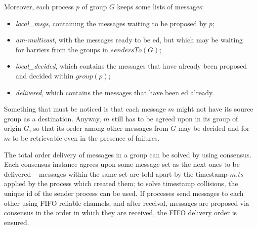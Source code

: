 \documentclass[times, 10pt]{article}
\begin{document}
Moreover, each process $p$ of group $G$ keeps some lists of messages:
\begin{itemize}
  \item \textit{local\_msgs}, containing the messages waiting to be proposed by $p$;
  \item \textit{am-multicast}, with the messages ready to be \cons{}ed, but which may be waiting for barriers from the groups in $sendersTo(G)$;
  \item \textit{local\_decided}, which contains the messages that have already been proposed and decided within $group(p)$;
  \item \textit{delivered}, which contains the messages that have been \cons{}ed already.
\end{itemize} 


Something that must be noticed is that each message $m$ might not have its source group as a destination. Anyway, $m$ still has to be agreed upon in its group of origin $G$, so that its order among other messages from $G$ may be decided and for %
$m$ to be retrievable even in the presence of failures.%







The total order delivery of messages in a group can be solved by using consensus. Each consensus instance agrees upon some message set as the next ones to be delivered -- messages within the same set are told apart by the timestamp $m.ts$ applied by the process which created them; to solve timestamp collisions, the unique id of the sender process can be used. If processes send messages to each other using FIFO reliable channels, and after receival, messages are proposed via consensus in the order in which they are received, the FIFO delivery order is ensured.
\end{document}
